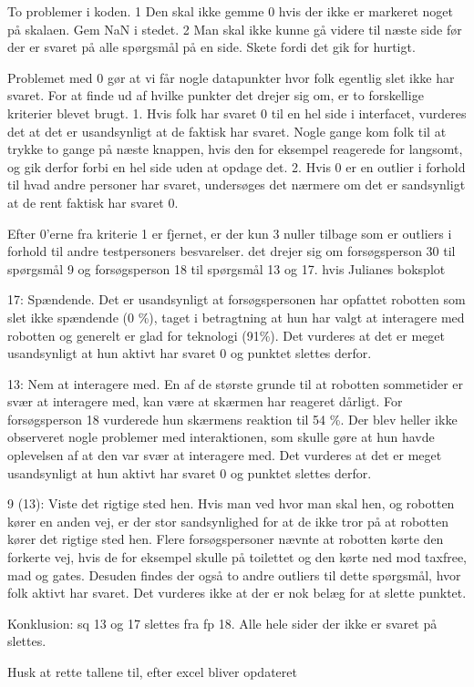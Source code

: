 To problemer i koden. 1 Den skal ikke gemme 0 hvis der ikke er markeret noget på skalaen. Gem NaN i stedet. 2 Man skal ikke kunne gå videre til næste side før der er svaret på alle spørgsmål på en side. Skete fordi det gik for hurtigt.

Problemet med 0 gør at vi får nogle datapunkter hvor folk egentlig slet ikke har svaret. For at finde ud af hvilke punkter det drejer sig om, er to forskellige kriterier blevet brugt. 
1. Hvis folk har svaret 0 til en hel side i interfacet, vurderes det at det er usandsynligt at de faktisk har svaret. Nogle gange kom folk til at trykke to gange på næste knappen, hvis den for eksempel reagerede for langsomt, og gik derfor forbi en hel side uden at opdage det.
2. Hvis 0 er en outlier i forhold til hvad andre personer har svaret, undersøges det nærmere om det er sandsynligt at de rent faktisk har svaret 0.

Efter 0'erne fra kriterie 1 er fjernet, er der kun 3 nuller tilbage som er outliers i forhold til andre testpersoners besvarelser. det drejer sig om forsøgsperson 30 til spørgsmål 9 og forsøgsperson 18 til spørgsmål 13 og 17. 
hvis Julianes boksplot

17: Spændende. Det er usandsynligt at forsøgspersonen har opfattet robotten som slet ikke spændende (0 \%), taget i betragtning at hun har valgt at interagere med robotten og generelt er glad for teknologi (91\%). Det vurderes at det er meget usandsynligt at hun aktivt har svaret 0 og punktet slettes derfor.

13: Nem at interagere med. En af de største grunde til at robotten sommetider er svær at interagere med, kan være at skærmen har reageret dårligt. For forsøgsperson 18 vurderede hun skærmens reaktion til 54 \%. Der blev heller ikke observeret nogle problemer med interaktionen, som skulle gøre at hun havde oplevelsen af at den var svær at interagere med. Det vurderes at det er meget usandsynligt at hun aktivt har svaret 0 og punktet slettes derfor.

9 (13): Viste det rigtige sted hen. Hvis man ved hvor man skal hen, og robotten kører en anden vej, er der stor sandsynlighed for at de ikke tror på at robotten kører det rigtige sted hen. Flere forsøgspersoner nævnte at robotten kørte den forkerte vej, hvis de for eksempel skulle på toilettet og den kørte ned mod taxfree, mad og gates. Desuden findes der også to andre outliers til dette spørgsmål, hvor folk aktivt har svaret. Det vurderes ikke at der er nok belæg for at slette punktet.

Konklusion: sq 13 og 17 slettes fra fp 18. Alle hele sider der ikke er svaret på slettes. 

Husk at rette tallene til, efter excel bliver opdateret


